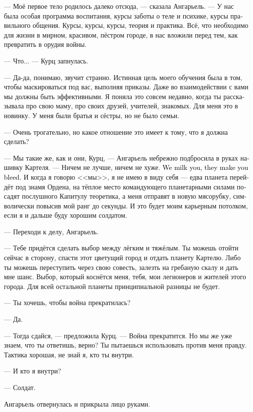 \documentclass[a4paper,12pt,fleqn]{book}\usepackage{cooltooltips}\usepackage{polyglossia}\setdefaultlanguage[babelshorthands=true]{russian}\setotherlanguage{english}\defaultfontfeatures{Ligatures=TeX,Mapping=tex-text} \usepackage{xcolor}\definecolor{lightgray}{HTML}{bbbbbb}\color{lightgray}\newcommand{\ml}[3]{\textenglish{\textcolor{black}{#3}}}
\begin{document}
--- Моё первое тело родилось далеко отсюда, --- сказала Ангарьель.
--- У нас была особая программа воспитания, курсы заботы о теле и психике, курсы правильного общения.
Курсы, курсы, курсы, теория и практика.
Всё, что необходимо для жизни в мирном, красивом, пёстром городе, в нас вложили перед тем, как превратить в орудия войны.

--- Что... --- Курц запнулась.

--- Да-да, понимаю, звучит странно.
Истинная цель моего обучения была в том, чтобы маскироваться под вас, выполняя приказы.
Даже во взаимодействии с вами мы должны быть эффективными.
Я поняла это совсем недавно, когда ты рассказывала про свою маму, про своих друзей, учителей, знакомых.
Для меня это в новинку.
У меня были братья и сёстры, но не было семьи.

--- Очень трогательно, но какое отношение это имеет к тому, что я должна сделать?

--- Мы такие же, как и они, Курц, --- Ангарьель небрежно подбросила в руках нашивку Картеля.
--- Ничем не лучше, ничем не хуже.
\ml{$0$}
{Мы будем вас доить, они будут выкачивать из вас кровь.}
{We milk you, they make you bleed.}
И когда я говорю <<мы>>, я не имею в виду себя --- едва планета перейдёт под знамя Ордена, на тёплое место командующего планетарными силами посадят послушного Капитулу теоретика, а меня отправят в новую мясорубку, символически повысив мой ранг до секунды.
И это будет моим карьерным потолком, если я и дальше буду хорошим солдатом.

--- Переходи к делу, Ангарьель.

--- Тебе придётся сделать выбор между лёгким и тяжёлым.
Ты можешь отойти сейчас в сторону, спасти этот цветущий город и отдать планету Картелю.
Либо ты можешь переступить через свою совесть, залезть на гребаную скалу и дать мне шанс.
Выбор, который коснётся меня, тебя, мои легионеров и жителей этого города.
Для всей остальной планеты принципиальной разницы не будет.

--- Ты хочешь, чтобы война прекратилась?

--- Да.

--- Тогда сдайся, --- предложила Курц.
--- Война прекратится.
Но мы же уже знаем, что ты ответишь, верно?
Ты пытаешься использовать против меня правду.
Тактика хорошая, не знай я, кто ты внутри.

--- И кто я внутри?

--- Солдат.

Ангарьель отвернулась и прикрыла лицо руками.
\end{document}
